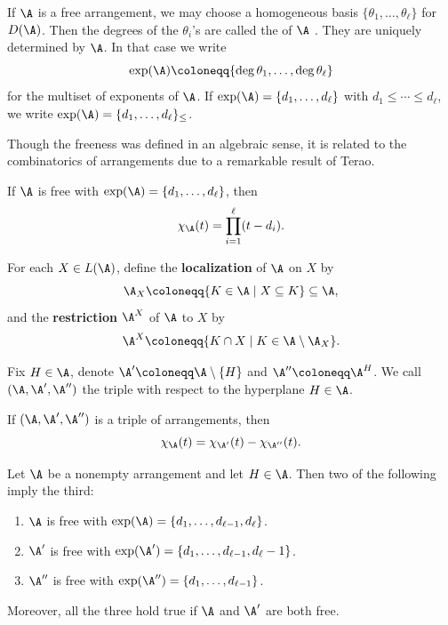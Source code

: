 If $\A$ is a free arrangement, we may choose a homogeneous basis $\{\theta_1, \ldots, \theta_\ell\}$ for $D(\A)$.
Then the degrees of the $\theta_i$'s are called the  of $\A$ \cite[Definition 4.25]{OT92}. 
They are uniquely determined by $\A$. 
In that case we write 
\[
\exp(\A)  \coloneqq  \{\deg{\theta_1},\ldots,\deg{\theta_\ell}\}\]
for the multiset of exponents of $\A$. 
If $\exp(\A) = \{d_1, \ldots, d_\ell\}$ with $ d_1 \leq \cdots \leq d_\ell$, we write  $\exp(\A) = \{d_1,\ldots, d_\ell\}_\le$.

Though the freeness was defined in an algebraic sense, it is related to the combinatorics of arrangements due to a remarkable result of Terao. 

\begin{theorem}\label{thm:Factorization}
If $\A$ is free with $\exp(\A) =\{d_{1}, \dots, d_{\ell}\} $, then 
$$\chi_\A(t)= \prod_{i=1}^\ell (t-d_i).$$
\end{theorem}

For each $X \in L(\A)$, define the \textbf{localization} of $\A$ on $X$  by 
$${\A}_X  \coloneqq \{ K \in {\A} \mid X \subseteq K\} \subseteq \A,$$
and the \textbf{restriction} ${\A}^{X}$ of ${\A}$ to $X$ by 
$${\A}^{X}  \coloneqq \{ K \cap X \mid K \in{\A }\setminus {\A}_X\}.$$

Fix $H \in \A$, denote $\A' \coloneqq \A\setminus \{H\}$ and $\A'' \coloneqq \A^H$. 
We call $(\A, \A', \A'')$ the triple with respect to the hyperplane $H \in\A$. 

 \begin{theorem}
 \label{thm:DR}
 If $(\A, \A', \A'')$ is a triple of arrangements, then
 \begin{equation*}
\chi_{\A}(t)=
\chi_{\A'}(t)-
\chi_{\A''}(t). 
\end{equation*}
\end{theorem}

 \begin{theorem}
 \label{thm:AD}
Let $\A$ be a nonempty arrangement and let $H \in \A$. Then two of the following imply the third:
\begin{enumerate}[(1)]
\item $\A$ is free with $\exp(\A) = \{d_1, \ldots, d_{\ell-1}, d_\ell\}$.
\item  $\A'$ is free with $\exp(\A')=\{d_1, \ldots, d_{\ell-1}, d_\ell-1\}$. 
\item $\A''$ is free with $\exp(\A'') = \{d_1, \ldots, d_{\ell-1}\}$.
\end{enumerate}
Moreover, all the three hold true if $\A$ and $\A'$ are both free.
\end{theorem}
 
